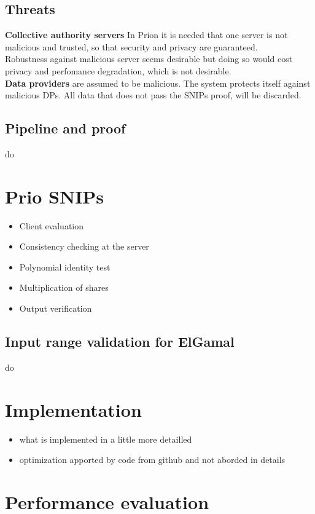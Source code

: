 \documentclass{article}
\begin{document}
\subsection{Threats}
\textbf{Collective authority servers} In Prion it is needed that one server is not malicious and trusted, so that security and privacy are guaranteed.\\
Robustness against malicious server seems desirable but doing so would cost privacy and perfomance degradation, which is not desirable.\\
\textbf{Data providers} are assumed to be malicious. The system protects itself against malicious DPs. All data that does not pass the SNIPs proof, will be discarded.\\

\subsection{Pipeline and proof}
do 
\section*{Prio SNIPs}
\begin{itemize}
\item Client evaluation
\item Consistency checking at the server
\item Polynomial identity test
\item Multiplication of shares
\item Output verification

\end{itemize}

\subsection{Input range validation for ElGamal}
do

\section*{Implementation}
\begin{itemize}

\item what is implemented in a little more detailled
\item optimization apported by code from github and not aborded in details

\end{itemize}
\section*{Performance evaluation}
\end{document}
